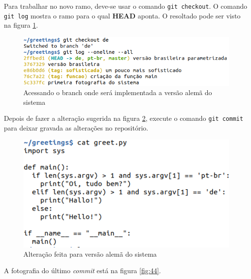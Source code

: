 \documentclass[a4paper]{book}
\begin{document}
Para trabalhar no novo ramo, deve-se usar o comando
\texttt{git checkout}. O comando \texttt{git log}
mostra o ramo para o qual \textbf{HEAD} aponta.
O resoltado pode ser visto na figura \ref{fig:42}.

\begin{figure}[ht]
\caption{Acessando o branch onde será implementada a versão alemã do sistema}
\label{fig:42}
\centering
\includegraphics[scale=0.6,left]{"images/42-Acessando o branch onde será implementada a versão alemã do sistema.png"}
\end{figure}

Depois de fazer a alteração sugerida na figura \ref{fig:43},
execute o comando \texttt{git commit} para deixar 
gravada as alterações no repositório.

\begin{figure}[ht]
\caption{Alteração feita para versão alemã do sistema}
\label{fig:43}
\centering
\includegraphics[scale=0.6,left]{"images/43-Alteração feita para versão alemã do sistema.png"}
\end{figure}

A fotografia do último \textit{commit} está na figura
\ref{fig:44}.
\end{document}
